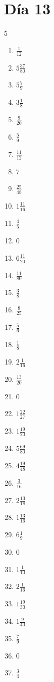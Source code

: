 \documentclass[12pt]{article}
\begin{document}
\section*{Día 13}
\begin{multicols}{5}\begin{enumerate}
\item $ \frac{1}{12} $
\item $ 5 \frac{37}{80} $
\item $ 5 \frac{7}{9} $
\item $ 3 \frac{1}{8} $
\item $ \frac{9}{20} $
\item $ \frac{5}{9} $
\item $ \frac{11}{12} $
\item $ 7 $
\item $ \frac{25}{48} $
\item $ 1 \frac{11}{16} $
\item $ \frac{4}{5} $
\item $ 0 $
\item $ 6 \frac{11}{20} $
\item $ \frac{11}{80} $
\item $ \frac{3}{8} $
\item $ \frac{8}{25} $
\item $ \frac{5}{6} $
\item $ \frac{1}{8} $
\item $ 2 \frac{1}{16} $
\item $ \frac{13}{20} $
\item $ 0 $
\item $ 1 \frac{22}{27} $
\item $ 1 \frac{19}{20} $
\item $ 5 \frac{69}{80} $
\item $ 4 \frac{19}{48} $
\item $ \frac{3}{16} $
\item $ 2 \frac{13}{18} $
\item $ 1 \frac{13}{16} $
\item $ 6 \frac{1}{9} $
\item $ 0 $
\item $ 1 \frac{1}{10} $
\item $ 2 \frac{1}{16} $
\item $ 1 \frac{19}{30} $
\item $ 1 \frac{9}{40} $
\item $ \frac{7}{9} $
\item $ 0 $
\item $ \frac{3}{4} $

\end{enumerate}
\end{multicols}
\end{document}

